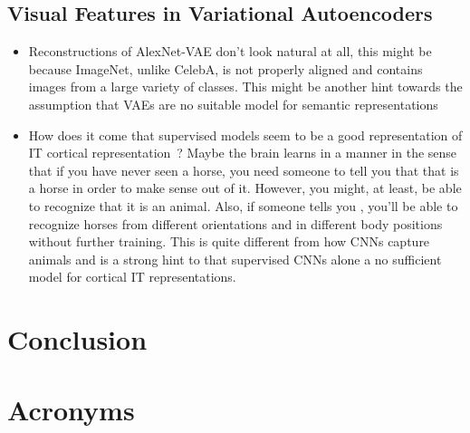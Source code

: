 \documentclass[11pt]{article}
\newcounter{savepage}
\begin{document}
    \subsection{Visual Features in Variational Autoencoders}\label{subsec:discussion_visual_features_in_variational_autoencoders}
    \begin{itemize}
        \item Reconstructions of AlexNet-VAE don't look natural at all, this might be because ImageNet, unlike CelebA, is not properly aligned and contains images from a large variety of classes.
        This might be another hint towards the assumption that \acp{VAE} are no suitable model for semantic representations
        \item How does it come that supervised models seem to be a good representation of \ac{IT} cortical representation~\citep{khaligh2014deep}? Maybe the brain learns in a  manner in the sense that if you have never seen a horse, you need someone to tell you that that is a horse in order to make sense out of it.
        However, you might, at least, be able to recognize that it is an animal.
        Also, if someone tells you , you'll be able to recognize horses from different orientations and in different body positions without further training.
        This is quite different from how \acp{CNN} capture animals and is a strong hint to that supervised \acp{CNN} alone a no sufficient model for cortical IT representations.
    \end{itemize}


    \section{Conclusion}\label{sec:conclusion}

    \newpage
    \printbibliography

    \newpage
    \setcounter{page}{\thesavepage}
    \section*{Acronyms}
    \begin{acronym}[TDMA]
    \end{acronym}
    \newpage
    \listoffigures
    \newpage
    \listoftables
    \newpage
    
\end{document}
